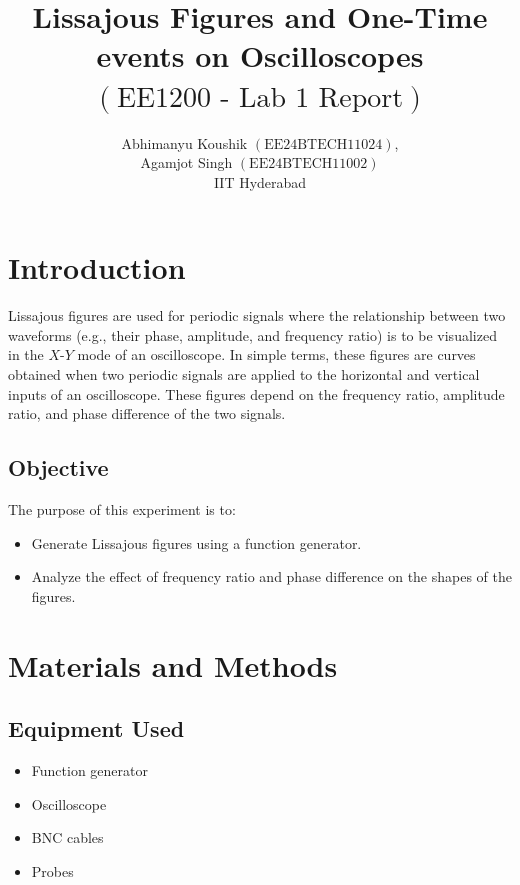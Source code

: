 \documentclass[12pt]{article}
\newcommand{\brak}[1]{\ensuremath{\left(#1\right)}}
\begin{document}

\vspace{3cm}

\title{Lissajous Figures and One-Time events on Oscilloscopes\\\brak{\text{EE1200 - Lab 1 Report}}}
\author{Abhimanyu Koushik \brak{\text{EE24BTECH11024}},\\Agamjot Singh \brak{\text{EE24BTECH11002}}\\IIT Hyderabad}
{\let\newpage\relax\maketitle}

\renewcommand{\thefigure}{\theenumi}
\renewcommand{\thetable}{\theenumi}
\setlength{\intextsep}{10pt} %

\renewcommand{\thetable}{\theenumi}

\section{Introduction}
Lissajous figures are used for periodic signals where the relationship between two waveforms (e.g., their phase, amplitude, and frequency ratio) is to be visualized in the $X$-$Y$ mode of an oscilloscope. In simple terms, these figures are curves obtained when two periodic signals are applied to the horizontal and vertical inputs of an oscilloscope. These figures depend on the frequency ratio, amplitude ratio, and phase difference of the two signals.

\subsection{Objective}
The purpose of this experiment is to:
\begin{itemize}
    \item Generate Lissajous figures using a function generator.
    \item Analyze the effect of frequency ratio and phase difference on the shapes of the figures.
\end{itemize}

\section{Materials and Methods}
\subsection{Equipment Used}
\begin{itemize}
    \item Function generator
    \item Oscilloscope
    \item BNC cables
    \item Probes
\end{itemize}
\end{document}
